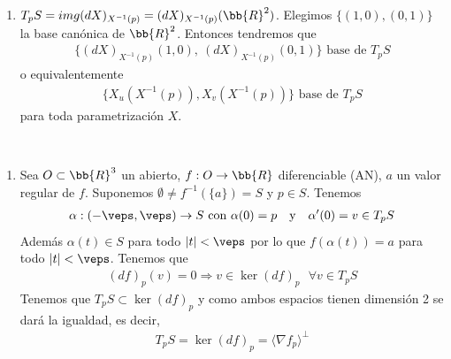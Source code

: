 \begin{observacion}
\begin{enumerate}
        \item $T_pS = img(dX)_{X^{-1}(p)} = (dX)_{X^{-1}(p)}(\bb{R}^2)$. Elegimos $\{(1,0), (0,1)\}$ la base canónica de $\bb{R}^2$. Entonces tendremos que 
        \begin{gather*}
            \{(dX)_{X^{-1}(p)}(1,0),\ (dX)_{X^{-1}(p)}(0,1)\} \text{ base de } T_pS
        \end{gather*}
        o equivalentemente
        \begin{gather*}
            \{X_u(X^{-1}(p)), X_v(X^{-1}(p))\} \text{ base de } T_pS
        \end{gather*}
        para toda parametrización $X$.
    \end{enumerate}
\end{observacion}

\begin{ejemplo}\
    \begin{enumerate}
        \item Sea $O\subset \bb{R}^3$ un abierto, $f:O\to \bb{R}$ diferenciable (AN), $a$ un valor regular de $f$. Suponemos $\emptyset \neq f^{-1}(\{a\}) = S$ y $p\in S$. Tenemos 
        \begin{gather*}
            \alpha : (-\veps, \veps) \to S\text{ con } \alpha(0)=p\ \ \text{ y } \ \ \alpha'(0)=v\in T_pS
        \end{gather*}
        Además $\alpha(t)\in S$ para todo $|t|<\veps$ por lo que $f(\alpha(t)) = a$ para todo $|t| < \veps$. Tenemos que 
        \begin{gather*}
            (df)_p(v) = 0 \Rightarrow v \in \ker(df)_p\ \ \ \forall v \in T_pS
        \end{gather*}
        Tenemos que $T_pS \subset \ker(df)_p$ y como ambos espacios tienen dimensión 2 se dará la igualdad, es decir,
        \begin{gather*}
            T_pS = \ker(df)_p = \langle \nabla f_p \rangle^{\bot}
        \end{gather*}


\end{enumerate}
\end{ejemplo}
